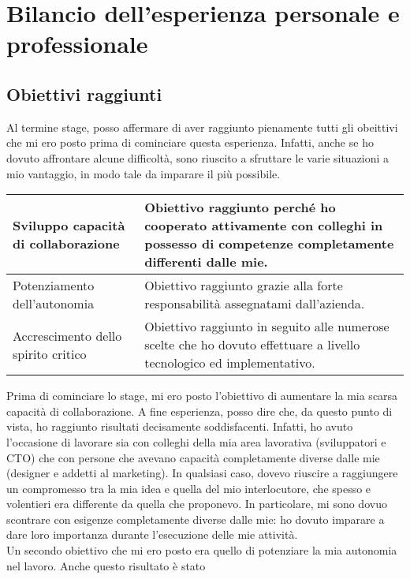 	\section{Bilancio dell'esperienza personale e professionale}
		\subsection{Obiettivi raggiunti}
			Al termine stage, posso affermare di aver raggiunto pienamente tutti gli obeittivi che mi ero posto prima di cominciare
			questa esperienza. Infatti, anche se ho dovuto affrontare alcune difficoltà, sono riuscito a sfruttare le varie situazioni
			a mio vantaggio, in modo tale da imparare il più possibile.\\
			\begin{center}
				\begin{tabular}[H]{p{} | p{}}
					Sviluppo capacità di collaborazione &
					Obiettivo raggiunto perché ho cooperato attivamente con colleghi in possesso di competenze completamente
					differenti dalle mie.\\
					\hline
					Potenziamento dell'autonomia &
					Obiettivo raggiunto grazie alla forte responsabilità assegnatami dall'azienda.\\
					\hline
					Accrescimento dello spirito critico &
					Obiettivo raggiunto in seguito alle numerose scelte che ho dovuto effettuare a livello tecnologico ed
					implementativo.\\
				\end{tabular}
			\end{center}
			Prima di cominciare lo stage, mi ero posto l'obiettivo di aumentare la mia scarsa capacità di collaborazione. A fine
			esperienza, posso dire che, da questo punto di vista, ho raggiunto risultati decisamente soddisfacenti. Infatti, ho
			avuto l'occasione di lavorare sia con colleghi della mia area lavorativa (sviluppatori e CTO) che con persone che avevano
			capacità completamente diverse dalle mie (designer e addetti al marketing). In qualsiasi caso, dovevo riuscire a raggiungere
			un compromesso tra la mia idea e quella del mio interlocutore, che spesso e volentieri era differente da quella che
			proponevo. In particolare, mi sono dovuo scontrare con esigenze completamente diverse dalle mie: ho dovuto imparare a dare
			loro importanza durante l'esecuzione delle mie attività.\\
			Un secondo obiettivo che mi ero posto era quello di potenziare la mia autonomia nel lavoro. Anche questo risultato è stato
